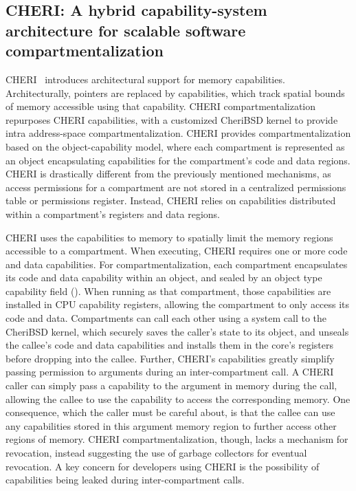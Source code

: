\subsection{CHERI: A hybrid capability-system architecture for scalable 
            software compartmentalization}
CHERI~\cite{WoodruffWCMADLNNR14} introduces architectural support for 
memory capabilities.
Architecturally, pointers are replaced by capabilities, which track 
spatial bounds of memory accessible using that capability. 
CHERI compartmentalization~\cite{WatsonWNMACDDGL15} repurposes 
CHERI capabilities, with a customized CheriBSD
kernel to provide intra address-space compartmentalization.
CHERI provides compartmentalization based on the object-capability model, 
where each compartment is represented as an object encapsulating capabilities
for the compartment's code and data regions.
CHERI is drastically different from the previously mentioned mechanisms,
as access permissions for a compartment are not stored in a centralized
permissions table or permissions register.
Instead, CHERI relies on capabilities distributed within a compartment's 
registers and data regions.

CHERI uses the capabilities to memory to spatially limit the memory regions
accessible to a compartment.
When executing, CHERI requires one or more code and data capabilities. 
For compartmentalization, each compartment encapsulates its code and data
capability within an object, and sealed by an object type capability 
field (). 
When running as that compartment, those capabilities are installed in CPU
capability registers, allowing the compartment to only access its code and data.
Compartments can call each other using a system call to the CheriBSD kernel,
which securely saves the caller's state to its object, and unseals the
callee's code and data capabilities and installs them in the core's registers 
before dropping into the callee.
Further, CHERI's capabilities greatly simplify passing permission to arguments
during an inter-compartment call.
A CHERI caller can simply pass a capability to the argument in memory during
the call, allowing the callee to use the capability to access the corresponding
memory.
One consequence, which the caller must be careful about, is that the callee can
use any capabilities stored in this argument memory region to further access other
regions of memory.
CHERI compartmentalization, though, lacks a mechanism for revocation,
instead suggesting the use of garbage collectors for eventual revocation.
A key concern for developers using CHERI is the possibility of capabilities
being leaked during inter-compartment calls.

